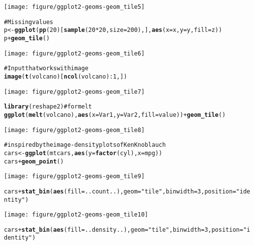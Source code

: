 \documentclass[a4paper,titlepage]{tufte-handout}\usepackage{graphicx, color}
\makeatletter
\def\maxwidth{ %
  \ifdim\Gin@nat@width>\linewidth
    \linewidth
  \else
    \Gin@nat@width
  \fi
}
\newcommand{\hlfunctioncall}[1]{\textcolor[rgb]{0.501960784313725,0,0.329411764705882}{\textbf{#1}}}%
\newcommand{\hlstring}[1]{\textcolor[rgb]{0.6,0.6,1}{#1}}%
\newcommand{\hlcomment}[1]{\textcolor[rgb]{0.180392156862745,0.6,0.341176470588235}{#1}}%
\newenvironment{kframe}{%
 \def\at@end@of@kframe{}%
 \ifinner\ifhmode%
  \def\at@end@of@kframe{\end{minipage}}%
  \begin{minipage}{\columnwidth}%
 \fi\fi%
 \def\FrameCommand##1{\hskip\@totalleftmargin \hskip-\fboxsep
 \colorbox{shadecolor}{##1}\hskip-\fboxsep
     \hskip-\linewidth \hskip-\@totalleftmargin \hskip\columnwidth}%
 \MakeFramed {\advance\hsize-\width
   \@totalleftmargin\z@ \linewidth\hsize
   \@setminipage}}%
 {\par\unskip\endMakeFramed%
 \at@end@of@kframe}
\newenvironment{knitrout}{}{} %
\makeatother
\begin{document}
\begin{knitrout}
\begin{kframe}
\begin{alltt}
\end{alltt}
\end{kframe}\texttt{[image: figure/ggplot2-geoms-geom\_tile5]} \begin{kframe}\begin{alltt}
\hlcomment{# Missing values}
p <- \hlfunctioncall{ggplot}(\hlfunctioncall{pp}(20)[\hlfunctioncall{sample}(20*20, size=200),], \hlfunctioncall{aes}(x=x,y=y,fill=z))
p + \hlfunctioncall{geom_tile}()
\end{alltt}
\end{kframe}\texttt{[image: figure/ggplot2-geoms-geom\_tile6]} \begin{kframe}\begin{alltt}
\hlcomment{# Input that works with image}
\hlfunctioncall{image}(\hlfunctioncall{t}(volcano)[\hlfunctioncall{ncol}(volcano):1,])
\end{alltt}
\end{kframe}\texttt{[image: figure/ggplot2-geoms-geom\_tile7]} \begin{kframe}\begin{alltt}
\hlfunctioncall{library}(reshape2) \hlcomment{# for melt}
\hlfunctioncall{ggplot}(\hlfunctioncall{melt}(volcano), \hlfunctioncall{aes}(x=Var1, y=Var2, fill=value)) + \hlfunctioncall{geom_tile}()
\end{alltt}
\end{kframe}\texttt{[image: figure/ggplot2-geoms-geom\_tile8]} \begin{kframe}\begin{alltt}
\hlcomment{# inspired by the image-density plots of Ken Knoblauch}
cars <- \hlfunctioncall{ggplot}(mtcars, \hlfunctioncall{aes}(y=\hlfunctioncall{factor}(cyl), x=mpg))
cars + \hlfunctioncall{geom_point}()
\end{alltt}
\end{kframe}\texttt{[image: figure/ggplot2-geoms-geom\_tile9]} \begin{kframe}\begin{alltt}
cars + \hlfunctioncall{stat_bin}(\hlfunctioncall{aes}(fill=..count..), geom=\hlstring{"tile"}, binwidth=3, position=\hlstring{"identity"})
\end{alltt}
\end{kframe}\texttt{[image: figure/ggplot2-geoms-geom\_tile10]} \begin{kframe}\begin{alltt}
cars + \hlfunctioncall{stat_bin}(\hlfunctioncall{aes}(fill=..density..), geom=\hlstring{"tile"}, binwidth=3, position=\hlstring{"identity"})

\end{alltt}
\end{kframe}
\end{knitrout}
\end{document}
